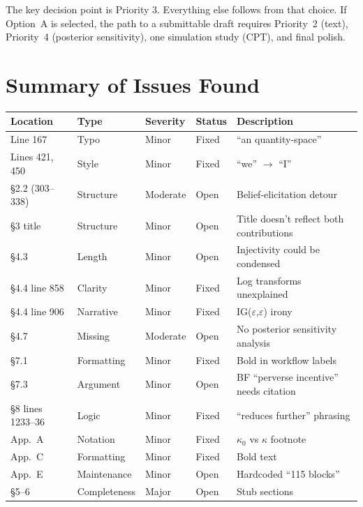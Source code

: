 \documentclass[12pt,a4paper]{article}
\begin{document}
The key decision point is Priority 3. Everything else follows from that
choice. If Option~A is selected, the path to a submittable draft requires
Priority~2 (text), Priority~4 (posterior sensitivity), one simulation
study (CPT), and final polish.


\section{Summary of Issues Found}

\begin{center}
\begin{tabular}{lllll}
\toprule
Location & Type & Severity & Status & Description \\
\midrule
Line 167 & Typo & Minor & Fixed & ``an quantity-space'' \\
Lines 421, 450 & Style & Minor & Fixed & ``we'' $\to$ ``I'' \\
\S2.2 (303--338) & Structure & Moderate & Open & Belief-elicitation detour \\
\S3 title & Structure & Minor & Open & Title doesn't reflect both contributions \\
\S4.3 & Length & Minor & Open & Injectivity could be condensed \\
\S4.4 line 858 & Clarity & Minor & Fixed & Log transforms unexplained \\
\S4.4 line 906 & Narrative & Minor & Fixed & IG($\varepsilon$,$\varepsilon$) irony \\
\S4.7 & Missing & Moderate & Open & No posterior sensitivity analysis \\
\S7.1 & Formatting & Minor & Fixed & Bold in workflow labels \\
\S7.3 & Argument & Minor & Open & BF ``perverse incentive'' needs citation \\
\S8 lines 1233--36 & Logic & Minor & Fixed & ``reduces further'' phrasing \\
App.\ A & Notation & Minor & Fixed & $\kappa_0$ vs $\kappa$ footnote \\
App.\ C & Formatting & Minor & Fixed & Bold text \\
App.\ E & Maintenance & Minor & Open & Hardcoded ``115 blocks'' \\
\S5--6 & Completeness & Major & Open & Stub sections \\
\bottomrule
\end{tabular}
\end{center}
\end{document}
